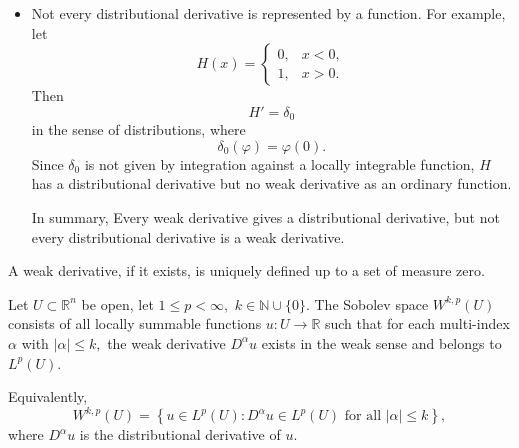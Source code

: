 \begin{remark}
\begin{itemize}
        \item
        Not every distributional derivative is represented by a function.
        For example, let
        \[
        H(x)
        =
        \begin{cases}
        0, & x<0,\\
        1, & x>0.
        \end{cases}
        \]
        Then
        \[
        H' = \delta_0
        \]
        in the sense of distributions, where
        \[
        \delta_0(\varphi)=\varphi(0).
        \]
        Since $\delta_0$ is not given by integration against a locally integrable
        function, $H$ has a distributional derivative but no weak derivative as an
        ordinary function.
        
        In summary, Every weak derivative gives a distributional derivative,
        but not every distributional derivative is a weak derivative.

    \end{itemize}
\end{remark}

\begin{proposition}
A weak derivative, if it exists, is uniquely defined up to a set of measure zero.
\end{proposition}

\begin{definition}
Let
$
U\subset \mathbb{R}^n
$
be open, let
$
1\le p<\infty,
$
$
k\in \mathbb{N}\cup\{0\}.
$
The Sobolev space
$
W^{k,p}(U)
$
consists of all locally summable functions
$
u:U\to \mathbb{R}
$
such that for each multi-index $\alpha$ with
$
|\alpha|\le k,
$
the weak derivative $D^\alpha u$ exists in the weak sense and belongs to $L^p(U)$.
\end{definition}

\begin{remark}
Equivalently,
$$
W^{k,p}(U)
=
\left\{
u\in L^p(U):
D^\alpha u\in L^p(U)
\text{ for all } |\alpha|\le k
\right\},
$$
where $D^\alpha u$ is the distributional derivative of $u$.
\end{remark}

